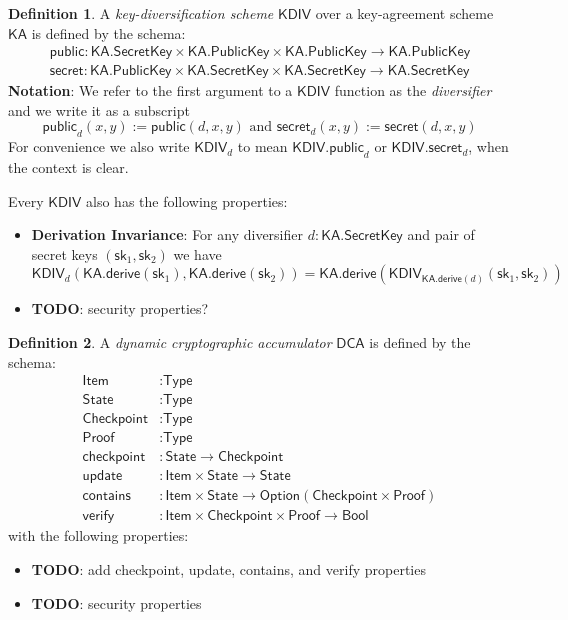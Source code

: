 \documentclass[a4paper]{article}
\newcommand{\TODO}[1]{{\color{red}\textbf{TODO}}: #1}
\theoremstyle{definition}
\newtheorem{definition}{Definition}[subsection]
\newcommand{\Bool}{{\textsf{Bool}}}
\newcommand{\Checkpoint}{{\textsf{Checkpoint}}}
\newcommand{\DCA}{{\textsf{DCA}}}
\newcommand{\Item}{{\textsf{Item}}}
\newcommand{\KA}{{\textsf{KA}}}
\newcommand{\KDIV}{{\textsf{KDIV}}}
\newcommand{\Option}{{\textsf{Option}}}
\newcommand{\Proof}{{\textsf{Proof}}}
\newcommand{\PublicKey}{{\textsf{PublicKey}}}
\newcommand{\SecretKey}{{\textsf{SecretKey}}}
\newcommand{\StateT}{{\textsf{State}}}
\newcommand{\Type}{{\textsf{Type}}}
\newcommand{\checkpoint}{{\textsf{checkpoint}}}
\newcommand{\contains}{{\textsf{contains}}}
\newcommand{\derive}{{\textsf{derive}}}
\newcommand{\public}{{\textsf{public}}}
\newcommand{\secret}{{\textsf{secret}}}
\newcommand{\sk}{{\textsf{sk}}}
\newcommand{\update}{{\textsf{update}}}
\newcommand{\verify}{{\textsf{verify}}}
\begin{document}
\begin{definition}
    A \emph{key-diversification scheme} $\KDIV$ over a key-agreement scheme $\KA$ is defined by the schema:
    \begin{align*}
        \public : \KA.\SecretKey \times \KA.\PublicKey \times \KA.\PublicKey \to \KA.\PublicKey \\
        \secret : \KA.\PublicKey \times \KA.\SecretKey \times \KA.\SecretKey \to \KA.\SecretKey
    \end{align*}
    \textbf{Notation}: We refer to the first argument to a $\KDIV$ function as the \emph{diversifier} and we write it as a subscript
    \[\public_d(x, y) := \public(d, x, y) \,\,\text{and}\,\, \secret_d(x, y) := \secret(d, x, y)\]
    For convenience we also write $\KDIV_d$ to mean $\KDIV.\public_d$ or $\KDIV.\secret_d$, when the context is clear.
    
    Every $\KDIV$ also has the following properties:
    \begin{itemize}
        \item \textbf{Derivation Invariance}: For any diversifier $d : \KA.\SecretKey$ and pair of secret keys $(\sk_1, \sk_2)$ we have
            \[\KDIV_d(\KA.\derive(\sk_1), \KA.\derive(\sk_2)) = \KA.\derive(\KDIV_{\KA.\derive(d)}(\sk_1, \sk_2))\]
        \item \TODO{security properties?}
    \end{itemize}
\end{definition}

\begin{definition}
    A \emph{dynamic cryptographic accumulator} $\DCA$ is defined by the schema:
    \begin{align*}
        \Item       &: \Type \\
        \StateT     &: \Type \\
        \Checkpoint &: \Type \\
        \Proof      &: \Type \\
        \checkpoint &: \StateT \to \Checkpoint \\
        \update     &: \Item \times \StateT \to \StateT \\
        \contains   &: \Item \times \StateT \to \Option(\Checkpoint \times \Proof) \\
        \verify     &: \Item \times \Checkpoint \times \Proof \to \Bool
    \end{align*}
    with the following properties:
    \begin{itemize}
        \item \TODO{add checkpoint, update, contains, and verify properties}
        \item \TODO{security properties}
    \end{itemize}
\end{definition}
\end{document}
